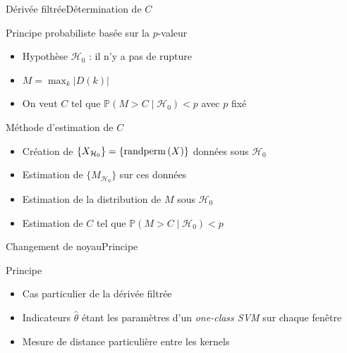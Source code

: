 \begin{frame}{Dérivée filtrée}{Détermination de $C$}

\begin{block}{Principe probabiliste basée sur la $p$-valeur}
\vspace{-.7em}
\begin{itemize}
\item Hypothèse $\mathcal{H}_0$ : il n'y a pas de rupture
\item $M = \displaystyle \max_{k} |D(k)|$
\item On veut $C$ tel que $\mathbb{P}(M>C\mid	\mathcal{H}_0) < p$ avec $p$ fixé
\end{itemize}
\end{block}

\begin{exampleblock}{Méthode d'estimation de $C$}
\vspace{-.7em}
\begin{itemize}
\item Création de $\{X_{\mathcal{H}_0}\} = \{\operatorname*{randperm}{(X)}\}$ données sous $\mathcal{H}_0$
\item Estimation de $\{M_{\mathcal{H}_0}\}$ sur ces données
\item Estimation de la distribution de $M$ sous $\mathcal{H}_0$
\item Estimation de $C$ tel que $\mathbb{P}(M>C\mid	\mathcal{H}_0) < p$
\end{itemize}
\end{exampleblock}

\end{frame}

\begin{frame}{Changement de noyau}{Principe}

\begin{block}{Principe}
\vspace{-.7em}
\begin{itemize}
\item Cas particulier de la dérivée filtrée
\item Indicateurs $\hat{\theta}$ étant les paramètres d'un \textit{one-class SVM} sur chaque fenêtre
\item Mesure de distance particulière entre les kernels
\end{itemize}
\end{block}

\end{frame}

